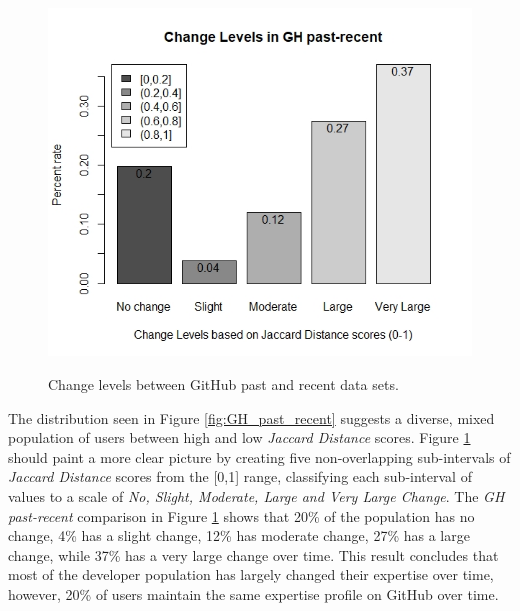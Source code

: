         \begin{figure}
          \centering
          \includegraphics[width=\textwidth]{figures/change_level_GH_past-recent.jpeg}\\
          \caption{Change levels between GitHub past and recent data sets.}
          \label{fig:change_GH_past_recent}
        \end{figure}
        
        The distribution seen in Figure \ref{fig:GH_past_recent} suggests a diverse, mixed population of users between high and low \emph{Jaccard Distance} scores. Figure \ref{fig:change_GH_past_recent} should paint a more clear picture by creating five non-overlapping sub-intervals of \emph{Jaccard Distance} scores from the [0,1] range, classifying each sub-interval of values to a scale of \emph{No, Slight, Moderate, Large and Very Large Change}. The \emph{GH past-recent} comparison in Figure \ref{fig:change_GH_past_recent} shows that 20\% of the population has no change, 4\% has a slight change, 12\% has moderate change, 27\% has a large change, while 37\% has a very large change over time. This result concludes that most of the developer population has largely changed their expertise over time, however, 20\% of users maintain the same expertise profile on GitHub over time.
        
